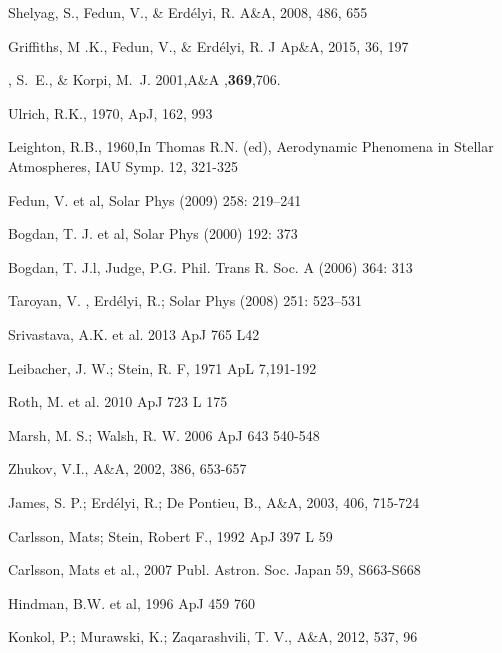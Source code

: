 \documentclass{aa}
\begin{document}
\begin{thebibliography}{}




 Shelyag, S., Fedun, V., \& Erd\'elyi, R. A\&A, 2008, 486, 655

 Griffiths, M .K., Fedun, V., \& Erd\'elyi, R. J Ap\&A, 2015, 36, 197

, S.~E., \& {Korpi}, M.~J. 2001,A\&A ,{\bf 369},706.

 Ulrich, R.K., 1970, ApJ, 162, 993

 Leighton, R.B., 1960,In Thomas R.N. (ed), Aerodynamic Phenomena in Stellar Atmospheres, IAU Symp. 12, 321-325

 Fedun, V. et al,  Solar Phys (2009) 258: 219–241

 Bogdan, T. J. et al,  Solar Phys (2000) 192: 373

 Bogdan, T. J.l, Judge, P.G.  Phil. Trans R. Soc. A (2006) 364: 313

 Taroyan, V. , Erdélyi, R.;  Solar Phys (2008) 251: 523–531

 Srivastava, A.K. et al. 2013 ApJ 765 L42

 Leibacher, J. W.; Stein, R. F, 1971 ApL 7,191-192

 Roth, M. et al. 2010 ApJ 723 L 175

  Marsh, M. S.; Walsh, R. W. 2006 ApJ 643 540-548

 Zhukov, V.I., A\&A, 2002, 386, 653-657

 James, S. P.; Erdélyi, R.; De Pontieu, B., A\&A, 2003, 406, 715-724

 Carlsson, Mats; Stein, Robert F., 1992 ApJ 397 L 59

 Carlsson, Mats et al., 2007 Publ. Astron. Soc. Japan 59, S663-S668

 Hindman, B.W. et al, 1996 ApJ 459 760

 Konkol, P.; Murawski, K.; Zaqarashvili, T. V., A\&A, 2012, 537, 96


\end{thebibliography}
\end{document}
